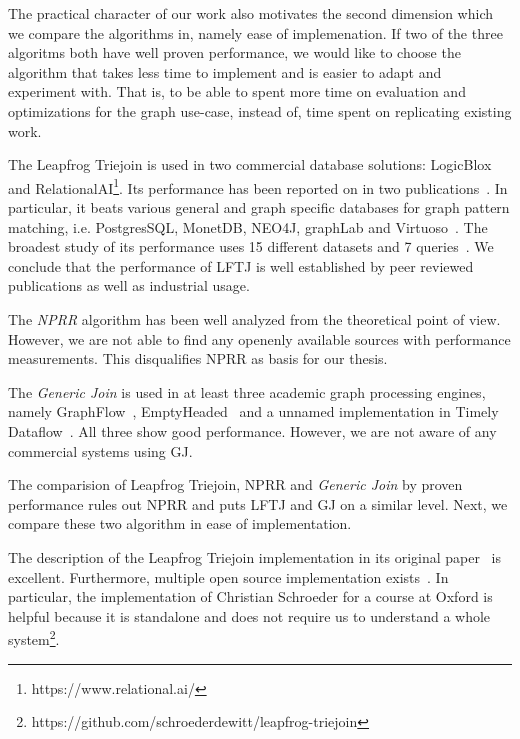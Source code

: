 The practical character of our work also motivates the second dimension which we compare the algorithms in, namely
ease of implemenation.
If two of the three algoritms both have well proven performance, we would like to choose the algorithm
that takes less time to implement and is easier to adapt and experiment with.
That is, to be able to spent more time on evaluation and optimizations for the graph use-case, instead of,
time spent on replicating existing work.

The Leapfrog Triejoin is used in two commercial database solutions:
LogicBlox~\cite{logicBlox} and RelationalAI\footnote{https://www.relational.ai/}.
Its performance has been reported on in two publications~\cite{myria-detailed,olddog}.
In particular, it beats various general and graph specific databases for graph pattern matching, i.e.
PostgresSQL, MonetDB, NEO4J, graphLab and Virtuoso~\cite{olddog}.
The broadest study of its performance uses 15 different datasets and 7 queries~\cite{olddog}.
We conclude that the performance of \textsc{LFTJ} is well established by peer reviewed publications
as well as industrial usage.

The \textit{NPRR} algorithm has been well analyzed from the theoretical point of view.
However, we are not able to find any openenly available sources with performance measurements.
This disqualifies \textsc{NPRR} as basis for our thesis.

The \textit{Generic Join} is used in at least three academic graph processing engines,
namely GraphFlow~\cite{graphflow}, EmptyHeaded~\cite{emptyheaded} and a unnamed implementation in
Timely Dataflow~\cite{ammar2018distributed}.
All three show good performance.
However, we are not aware of any commercial systems using \textsc{GJ}.

The comparision of Leapfrog Triejoin, \textsc{NPRR} and \textit{Generic Join} by proven performance
rules out \textsc{NPRR} and puts \textsc{LFTJ} and \textsc{GJ} on a similar level.
Next, we compare these two algorithm in ease of implementation.

The description of the Leapfrog Triejoin implementation in its original paper~\cite{lftj} is excellent.
Furthermore, multiple open source implementation exists~\cite{leapfrog-triejoin-schroeder,myria-detailed}.
In particular, the implementation of Christian Schroeder for a course at Oxford is helpful because it is standalone and
does not require us to understand a whole system\footnote{https://github.com/schroederdewitt/leapfrog-triejoin}.

